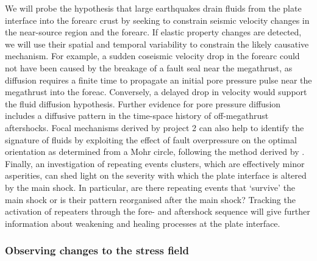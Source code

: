 \documentclass[11pt]{article}
\newcommand{\noteft}[1]{{\it \color{magenta} FT:#1}}
\newcommand{\noteft}[1]{}
\begin{document}
We will probe the hypothesis that large earthquakes drain fluids from the plate interface into the forearc crust by seeking to constrain   seismic velocity changes in the near-source region and the forearc.
If elastic property changes are detected, we will use their spatial and temporal variability to constrain the likely causative mechanism.  For example, a sudden coseismic velocity drop in the forearc could not 
have been caused by the breakage of a fault seal near the megathrust, as diffusion requires a finite time to propagate an initial pore pressure pulse near the megathrust into the foreac. Conversely, a delayed drop in velocity would support the fluid diffusion hypothesis. Further evidence for pore pressure diffusion includes a diffusive pattern in the time-space history of off-megathrust aftershocks.
Focal mechanisms derived by project 2 can also help to identify the signature of fluids by exploiting the effect of fault overpressure on the optimal orientation as determined from a Mohr circle, following the method derived by \citet{terakawa10}.
Finally, an investigation of repeating events clusters, which are effectively minor asperities, can shed light on the severity with which the plate interface is altered by the main shock. In particular, are there repeating events that `survive' the main shock or is their pattern reorganised after the main shock? Tracking the activation of repeaters through the fore- and aftershock sequence will give further information about weakening and healing processes at the plate interface.

\subsubsection{Observing changes to the stress field}
\end{document}
